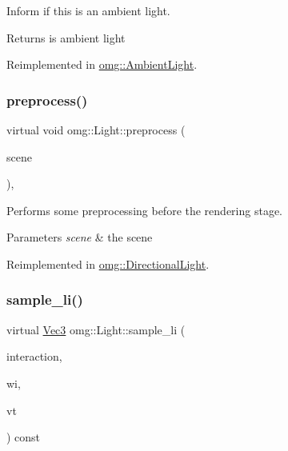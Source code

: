 Inform if this is an ambient light. 

\begin{DoxyReturn}{Returns}
is ambient light 
\end{DoxyReturn}


Reimplemented in \mbox{\hyperlink{classomg_1_1_ambient_light_a97dcae69b5ef72ca8845e03a4c3185e4}{omg\+::\+Ambient\+Light}}.

\mbox{\label{classomg_1_1_light_a8379b1dea7517c4e7fb6e0b5280c94d6}} 
\subsubsection{\texorpdfstring{preprocess()}{preprocess()}}
{\footnotesize\ttfamily virtual void omg\+::\+Light\+::preprocess (\begin{DoxyParamCaption}\item[{const \mbox{\hyperlink{classomg_1_1_scene}{Scene}} \&}]{scene }\end{DoxyParamCaption})\hspace{0.3cm}{\ttfamily [inline]}, {\ttfamily [virtual]}}



Performs some preprocessing before the rendering stage. 


\begin{DoxyParams}{Parameters}
{\em scene} & the scene \\
\hline
\end{DoxyParams}


Reimplemented in \mbox{\hyperlink{classomg_1_1_directional_light_ae7df9384508e8692781f1e1df03ccf4e}{omg\+::\+Directional\+Light}}.

\mbox{\label{classomg_1_1_light_a046b7db0856d786f171979189df68037}} 
\subsubsection{\texorpdfstring{sample\_li()}{sample\_li()}}
{\footnotesize\ttfamily virtual \mbox{\hyperlink{namespaceomg_a45a9482677fee9933ff369b49894e316}{Vec3}} omg\+::\+Light\+::sample\+\_\+li (\begin{DoxyParamCaption}\item[{const \mbox{\hyperlink{classomg_1_1_surface_interaction}{Surface\+Interaction}} \&}]{interaction,  }\item[{\mbox{\hyperlink{namespaceomg_a45a9482677fee9933ff369b49894e316}{Vec3}} $\ast$}]{wi,  }\item[{\mbox{\hyperlink{classomg_1_1_visibility_tester}{Visibility\+Tester}} $\ast$}]{vt }\end{DoxyParamCaption}) const\hspace{0.3cm}{\ttfamily [pure virtual]}}



